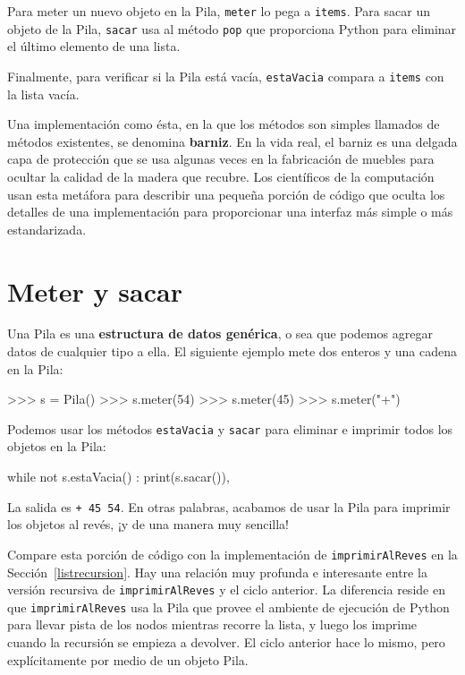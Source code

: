 Para meter un nuevo objeto en la Pila, \texttt{meter} lo pega a \texttt{items}.
Para sacar un objeto de la Pila, \texttt{sacar} usa al método \texttt{pop}
que proporciona Python para eliminar el último elemento de una lista.

Finalmente, para verificar si la Pila está vacía, \texttt{estaVacia}
compara a \texttt{items} con la lista vacía.


Una implementación como ésta, en la que los métodos son simples llamados
de métodos existentes, se denomina \textbf{barniz}. En la vida real,
el barniz es una delgada capa de protección que se usa algunas veces
en la fabricación de muebles para ocultar la calidad de la madera
que recubre. Los científicos de la computación usan esta metáfora
para describir una pequeña porción de código que oculta los detalles
de una implementación para proporcionar una interfaz más simple o
más estandarizada.

\section{Meter y sacar}

  

Una Pila es una \textbf{estructura de datos genérica}, o sea que podemos
agregar datos de cualquier tipo a ella. El siguiente ejemplo mete
dos enteros y una cadena en la Pila:

\beforeverb 
\begin{pyconcode}
>>> s = Pila()
>>> s.meter(54)
>>> s.meter(45)
>>> s.meter("+")
\end{pyconcode}
\afterverb Podemos usar los métodos \texttt{estaVacia} y \texttt{sacar}
para eliminar e imprimir todos los objetos en la Pila:

\beforeverb 
\begin{pythoncode}
while not s.estaVacia() :
  print(s.sacar()),
\end{pythoncode}
\afterverb La salida es \texttt{+ 45 54}. En otras palabras, acabamos
de usar la Pila para imprimir los objetos al revés, ¡y de una manera
muy sencilla!

Compare esta porción de código con la implementación de \texttt{imprimirAlReves}
en la Sección~\ref{listrecursion}. Hay una relación muy profunda
e interesante entre la versión recursiva de \texttt{imprimirAlReves}
y el ciclo anterior. La diferencia reside en que \texttt{imprimirAlReves}
usa la Pila que provee el ambiente de ejecución de Python para llevar
pista de los nodos mientras recorre la lista, y luego los imprime
cuando la recursión se empieza a devolver. El ciclo anterior hace
lo mismo, pero explícitamente por medio de un objeto Pila.

